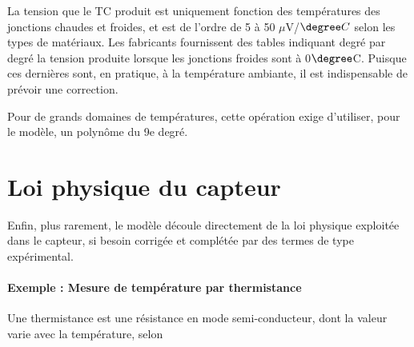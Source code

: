 La tension que le TC produit est uniquement fonction des températures des jonctions chaudes et froides, et est de l'ordre de 5 à 50 $\mu$V/$\degree C$ selon les types de matériaux. Les fabricants fournissent des tables indiquant degré par degré la tension produite lorsque les jonctions froides sont à 0$\degree$C. Puisque ces dernières sont, en pratique, à la température ambiante, il est indispensable de prévoir une correction.


Pour de grands domaines de températures, cette opération exige d'utiliser, pour le modèle, un polynôme du 9e degré.


\section{Loi physique du capteur}

Enfin, plus rarement, le modèle découle directement de la loi physique exploitée dans le capteur, si besoin corrigée et complétée par des termes de type expérimental.

\paragraph{Exemple : Mesure de température par thermistance}

Une thermistance est une résistance en mode semi-conducteur, dont la valeur varie avec la température, selon

